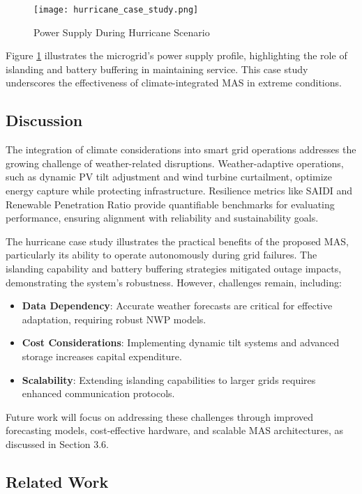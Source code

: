 \documentclass[12pt]{article}
\begin{document}
\begin{figure}[h]
\centering
\texttt{[image: hurricane\_case\_study.png]}
\caption{Power Supply During Hurricane Scenario}
\label{fig:hurricane_case_study}
\end{figure}

Figure \ref{fig:hurricane_case_study} illustrates the microgrid’s power supply profile, highlighting the role of islanding and battery buffering in maintaining service. This case study underscores the effectiveness of climate-integrated MAS in extreme conditions.

\subsection{Discussion}

The integration of climate considerations into smart grid operations addresses the growing challenge of weather-related disruptions. Weather-adaptive operations, such as dynamic PV tilt adjustment and wind turbine curtailment, optimize energy capture while protecting infrastructure. Resilience metrics like SAIDI and Renewable Penetration Ratio provide quantifiable benchmarks for evaluating performance, ensuring alignment with reliability and sustainability goals.

The hurricane case study illustrates the practical benefits of the proposed MAS, particularly its ability to operate autonomously during grid failures. The islanding capability and battery buffering strategies mitigated outage impacts, demonstrating the system’s robustness. However, challenges remain, including:
\begin{itemize}
    \item \textbf{Data Dependency}: Accurate weather forecasts are critical for effective adaptation, requiring robust NWP models.
    \item \textbf{Cost Considerations}: Implementing dynamic tilt systems and advanced storage increases capital expenditure.
    \item \textbf{Scalability}: Extending islanding capabilities to larger grids requires enhanced communication protocols.
\end{itemize}

Future work will focus on addressing these challenges through improved forecasting models, cost-effective hardware, and scalable MAS architectures, as discussed in Section 3.6.

\subsection{Related Work}
\end{document}
